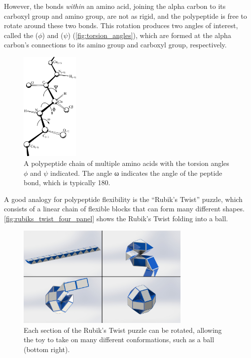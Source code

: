 However, the bonds \textit{within} an amino acid, joining the alpha carbon to its carboxyl group and amino group, are not as rigid, and the polypeptide is free to rotate around these two bonds. This rotation produces two angles of interest, called the  ($\phi$) and  ($\psi$) (\autoref{fig:torsion_angles}), which are formed at the alpha carbon's connections to its amino group and carboxyl group, respectively.\\

\begin{figure}[h]
	\centering
	\mySfFamily
	\includegraphics[width = 0.25\textwidth]{../images/torsion_angles.png}
	\caption{A polypeptide chain of multiple amino acids with the torsion angles $\phi$ and $\psi$ indicated. The angle ω indicates the angle of the peptide bond, which is typically 180\textdegree.}
	\label{fig:torsion_angles}
\end{figure}

A good analogy for polypeptide flexibility is the ``Rubik's Twist'' puzzle, which consists of a linear chain of flexible blocks that can form many different shapes. \autoref{fig:rubiks_twist_four_panel} shows the Rubik's Twist folding into a ball.

\begin{figure}[h]
	\centering
	\mySfFamily
	\includegraphics[width = 0.75\textwidth]{../images/rubiks_twist_four_panel.jpg}
	\caption{Each section of the Rubik's Twist puzzle can be rotated, allowing the toy to take on many different conformations, such as a ball (bottom right).}
	\label{fig:rubiks_twist_four_panel}
\end{figure}

